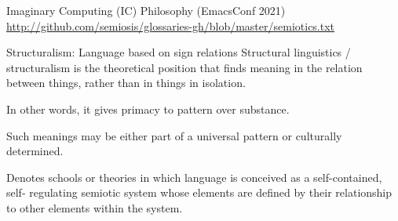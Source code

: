 \documentclass[presentation]{beamer}
\begin{document}
\begin{frame}[label={sec:org521a5d2}]{Imaginary Computing (IC) Philosophy (EmacsConf 2021)}
\url{http://github.com/semiosis/glossaries-gh/blob/master/semiotics.txt}

\begin{block}{Structuralism: Language based on sign relations}
Structural linguistics / structuralism is the
theoretical position that finds meaning in the
relation between things, rather than in things
in isolation.

In other words, it gives primacy to pattern
over substance.

Such meanings may be either part of a
universal pattern or culturally determined.

Denotes schools or theories in which language
is conceived as a self-contained, self-
regulating semiotic system whose elements are
defined by their relationship to other
elements within the system.
\end{block}
\end{frame}
\end{document}
